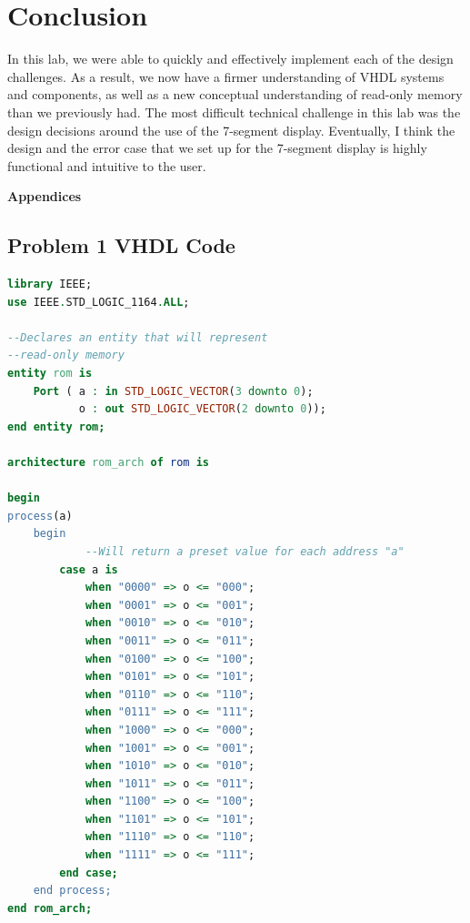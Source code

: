 \documentclass[11pt]{article}
\begin{document}
\section{Conclusion}
In this lab, we were able to quickly and effectively implement each of the design challenges. As a result, we now have a firmer understanding of VHDL systems and components, as well as a new conceptual understanding of read-only memory than we previously had. The most difficult technical challenge in this lab was the design decisions around the use of the 7-segment display. Eventually, I think the design and the error case that we set up for the 7-segment display is highly functional and intuitive to the user.

\pagebreak

\textbf{Appendices}

\begin{appendices}

\section{Problem 1 VHDL Code}

\begin{lstlisting}[language=VHDL]
library IEEE;
use IEEE.STD_LOGIC_1164.ALL;

--Declares an entity that will represent
--read-only memory
entity rom is
    Port ( a : in STD_LOGIC_VECTOR(3 downto 0);
           o : out STD_LOGIC_VECTOR(2 downto 0));
end entity rom;

architecture rom_arch of rom is
    
begin
process(a)
    begin
    		--Will return a preset value for each address "a"
        case a is
            when "0000" => o <= "000";
            when "0001" => o <= "001";
            when "0010" => o <= "010";
            when "0011" => o <= "011";
            when "0100" => o <= "100";
            when "0101" => o <= "101";
            when "0110" => o <= "110";
            when "0111" => o <= "111";
            when "1000" => o <= "000";
            when "1001" => o <= "001";
            when "1010" => o <= "010";
            when "1011" => o <= "011";
            when "1100" => o <= "100";
            when "1101" => o <= "101";
            when "1110" => o <= "110";
            when "1111" => o <= "111";
        end case;
    end process;
end rom_arch;
\end{lstlisting}


\end{appendices}
\end{document}

